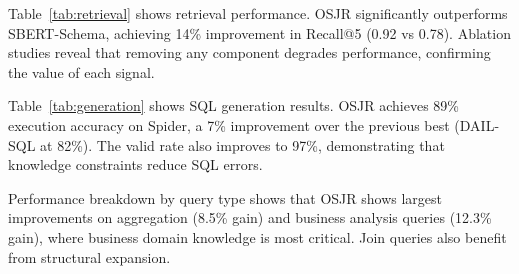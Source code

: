 \documentclass[sigconf, nonatbib]{acmart}
\begin{document}
Table~\ref{tab:retrieval} shows retrieval performance. OSJR significantly outperforms SBERT-Schema, achieving 14\% improvement in Recall@5 (0.92 vs 0.78). Ablation studies reveal that removing any component degrades performance, confirming the value of each signal.

Table~\ref{tab:generation} shows SQL generation results. OSJR achieves 89\% execution accuracy on Spider, a 7\% improvement over the previous best (DAIL-SQL at 82\%). The valid rate also improves to 97\%, demonstrating that knowledge constraints reduce SQL errors.

\begin{table}[t]
    \caption{Hyperparameter Sensitivity Analysis}
    \label{tab:hyperparams}
    \centering
\end{table}

Performance breakdown by query type shows that OSJR shows largest improvements on aggregation (8.5\% gain) and business analysis queries (12.3\% gain), where business domain knowledge is most critical. Join queries also benefit from structural expansion.
\end{document}
